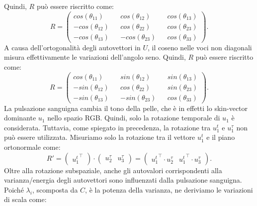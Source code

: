 \documentclass[journal,A4paper,compsoc,epsfig]{IEEEtran}
\begin{document}
      Quindi, $R$ può essere riscritto come:
      \begin{equation}
        R =
        \begin{pmatrix}
          cos(\theta_{11}) && cos(\theta_{12}) && cos(\theta_{13}) \\
          -cos(\theta_{12}) && cos(\theta_{22}) && cos(\theta_{23}) \\
          -cos(\theta_{13}) && -cos(\theta_{23}) && cos(\theta_{33})
        \end{pmatrix}.
        \label{eq:RotationMatrixCos}
      \end{equation}
      A causa dell'ortogonalità degli autovettori in $U$, il coseno nelle voci non diagonali misura effettivamente le variazioni dell'angolo seno.
      Quindi, $R$ può essere riscritto come:
      \begin{equation}
        R =
        \begin{pmatrix}
          cos(\theta_{11}) && sin(\theta_{12}) && sin(\theta_{13}) \\
          -sin(\theta_{12}) && cos(\theta_{22}) && sin(\theta_{23}) \\
          -sin(\theta_{13}) && -sin(\theta_{23}) && cos(\theta_{33})
        \end{pmatrix}.
        \label{eq:RotationMatrixCosSin}
      \end{equation}
      La pulsazione sanguigna cambia il tono della pelle, che è in effetti lo skin-vector dominante $u_1$ nello spazio RGB. Quindi, solo la rotazione temporale di $u_1$ è considerata.
      Tuttavia, come spiegato in precedenza, la rotazione tra $u^t_1$ e $u^{\tau}_1$ non può essere utilizzata.
      Misuriamo solo la rotazione tra il vettore $u^t_1$ e il piano ortonormale come:
      \begin{equation}
        R' =
        \begin{pmatrix}
          {u^t_1}^{\top}
        \end{pmatrix} \cdot
        \begin{pmatrix}        
          u^{\tau}_2 &
          u^{\tau}_3
        \end{pmatrix} =
        \begin{pmatrix}
          {u^t_1}^{\top} \cdot u^{\tau}_2 &
          {u^t_1}^{\top} \cdot u^{\tau}_3
        \end{pmatrix}.
        \label{eq:RRoration}
      \end{equation}
      Oltre alla rotazione subspaziale, anche gli autovalori corrispondenti alla varianza/energia degli autovettori sono influenzati dalla pulsazione sanguigna. Poiché $\lambda_i$, scomposta da $C$, è la potenza della varianza, ne deriviamo le variazioni di scala come:
\end{document}
